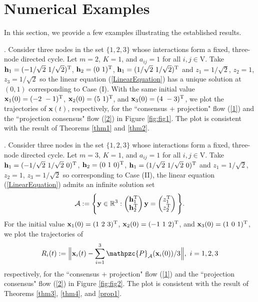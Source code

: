 \documentclass[a4paper, 11pt]{article}
\def\T{^{\rm\tiny T}}
\begin{document}
\section{Numerical Examples}\label{Sec:numerical}
In this section, we provide a few examples illustrating the established results.

\medskip

. Consider three nodes in the set $\{1,2,3\}$ whose interactions form a fixed, three-node directed cycle. Let $m=2$, $K=1$, and $a_{ij}=1$ for all $i,j\in\mathrm{V}$.  Take $\mathbf{h}_1 =(-1/\sqrt{2}\ 1/\sqrt{2})\T$, $\mathbf{h}_2 =(0\ 1)\T$, $\mathbf{h}_1 =(1/\sqrt{2}\ 1/\sqrt{2})\T$ and $z_1=1/\sqrt{2}$, $z_2=1$,  $z_3=1/\sqrt{2}$ so the linear equation (\ref{LinearEquation}) has a unique solution at $(0,1)$ corresponding to Case (I). With the same initial value $\mathbf{x}_1(0)=(-2\ -1)\T$, $\mathbf{x}_2(0)=(5\ 1)\T$, and $\mathbf{x}_3(0)=(4\ -3)\T$, we plot the trajectories of $\mathbf{x}(t)$, respectively, for the ``consensus + projection" flow (\ref{1}) and the ``projection consensus" flow (\ref{2}) in Figure \ref{fig:fig1}. The plot is consistent with the result of Theorems \ref{thm1} and \ref{thm2}.


\medskip

. Consider three nodes in the set $\{1,2,3\}$ whose interactions form a fixed, three-node directed cycle.  Let $m=3$, $K=1$, and $a_{ij}=1$ for all $i,j\in\mathrm{V}$.   Take $\mathbf{h}_1 =(-1/\sqrt{2}\ 1/\sqrt{2}\ 0)\T$, $\mathbf{h}_2 =(0\ 1\ 0)\T$, $\mathbf{h}_1 =(1/\sqrt{2}\ 1/\sqrt{2}\ 0)\T$ and $z_1=1/\sqrt{2}$, $z_2=1$,  $z_3=1/\sqrt{2}$ so corresponding to Case (II), the linear equation (\ref{LinearEquation}) admits an infinite solution set  $$
\mathcal{A}:=\Bigg\{\mathbf{y}\in\mathbb{R}^3:  \begin{pmatrix}
  \mathbf{h}_1\T \\
 \mathbf{h}_2\T
 \end{pmatrix}\mathbf{y}=\begin{pmatrix}
  z_1\T \\
 z_2\T
 \end{pmatrix}\Bigg\}.
$$
 For the initial value  $\mathbf{x}_1(0)=(1\ 2\  3 )\T$, $\mathbf{x}_2(0)=(  -1\ 1\ 2)\T$, and $\mathbf{x}_3(0)=(1\ 0\  1)\T$, we plot the trajectories of $$
 R_i(t):=\Big\|\mathbf{x}_i(t)-\sum_{i=1}^3 \mathpzc{P}_\mathcal{A} (\mathbf{x}_i(0))/3\Big\|, \ i=1,2,3
 $$
 respectively, for the ``consensus + projection" flow (\ref{1}) and the ``projection consensus" flow (\ref{2})  in Figure \ref{fig:fig2}. The plot is consistent with the result of Theorems \ref{thm3}, \ref{thm4}, and \ref{prop1}.
\end{document}
